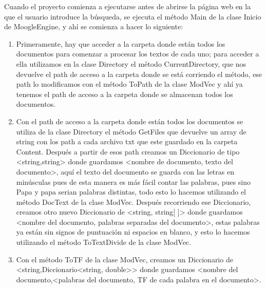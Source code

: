 \documentclass[12pt, a4paper]{article}
\begin{document}
Cuando el proyecto comienza a ejecutarse antes de abrirse la página web
en la que el usuario introduce la búsqueda, se ejecuta el método Main
de la clase Inicio de MoogleEngine, y ahí se comienza a hacer lo siguiente:

\begin{enumerate}
    \item Primeramente, hay que acceder a la carpeta donde están todos los documentos
          para comenzar a procesar los textos de cada uno; para acceder a ella
          utilizamos en la clase Directory el método CurrentDirectory, que nos
          devuelve el path de acceso a la carpeta donde se está corriendo el método,
          ese path lo modificamos con el método ToPath de la clase ModVec y ahí ya
          tenemos el path de acceso a la carpeta donde se almacenan todos
          los documentos.
    \item Con el path de acceso a la carpeta donde están todos los documentos
          se utiliza de la clase Directory el método GetFiles que devuelve
          un array de string con los path a cada archivo txt que este guardado
          en la carpeta Content. Después a partir de esos path creamos un
          Diccionario de tipo <string,string> donde guardamos
          <nombre de documento, texto del documento>, aquí el texto del documento
          se guarda con las letras en minúsculas pues de esta manera es más fácil
          contar las palabras, pues sino Papa y papa serian palabras distintas,
          todo esto lo hacemos utilizando el método DocText de la clase ModVec.
          Después recorriendo ese Diccionario, creamos otro nuevo Diccionario de
          <string, string[ ]> donde guardamos
          <nombre del documento, palabras separadas del documento>,
          estas palabras ya están sin signos de puntuación ni espacios en blanco,
          y esto lo hacemos utilizando el método ToTextDivide de la clase ModVec.
    \item Con el método ToTF de la clase ModVec, creamos un Diccionario de
          <string,Diccionario<string, double>> donde guardamos
          <nombre del documento,<palabras del documento, TF de cada palabra en el documento>.\\


\end{enumerate}
\end{document}
